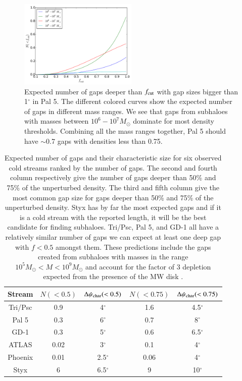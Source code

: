 \documentclass[useAMS,usenatbib]{mn2e}
\begin{document}
\begin{figure}
\centering
\includegraphics[width=0.5\textwidth]{observable_number_vs_f_cut_pal_5_array.pdf}
\caption{Expected number of gaps deeper than $f_{\rm cut}$ with gap sizes bigger than 1$^\circ$ in Pal 5. The different colored curves show the expected number of gaps in different mass ranges. We see that gaps from subhaloes with masses between $10^6-10^7 M_\odot$ dominate for most density thresholds. Combining all the mass ranges together, Pal 5 should have $\sim$0.7 gaps with densities less than 0.75.  } 
\label{fig:expected_gaps_Pal5}
\end{figure}  

\begin{table}
\begin{center}
\caption{Expected number of gaps and their characteristic size for six observed cold streams ranked by the number of gaps. The second and fourth column respectively give the number of gaps deeper than 50\% and 75\% of the unperturbed density. The third and fifth column give the most common gap size for gaps deeper than 50\% and 75\% of the unperturbed density. Styx has by far the most expected gaps and if it is a cold stream with the reported length, it will be the best candidate for finding subhaloes. Tri/Psc, Pal 5, and GD-1 all have a relatively similar number of gaps we can expect at least one deep gap with $f<0.5$ amongst them. These predictions include the gaps created from subhaloes with masses in the range $10^5 M_\odot < M < 10^9 M_\odot$ and account for the factor of 3 depletion expected from the presence of the MW disk \protect\citep{donghia_et_al_2010}. }
\begin{tabular}{|c|c|c|c|c|}
\hline
Stream & $N(<0.5)$ & $\Delta \psi_{\rm char}(<0.5)$ & $N(<0.75)$& $\Delta \psi_{\rm char}(<0.75)$  \\ \hline
Tri/Psc & 0.9 & 4$^\circ$ & 1.6 & 4.5$^\circ$\\
Pal 5 & 0.3 & 6$^\circ$ & 0.7 & 8$^\circ$\\ 
GD-1 & 0.3 & 5$^\circ$ & 0.6 & 6.5$^\circ$\\
ATLAS & 0.02 & 3$^\circ$ & 0.1 & 4$^\circ$\\
Phoenix & 0.01 & 2.5$^\circ$ & 0.06 & 4$^\circ$\\
Styx & 6 & 6.5$^\circ$ & 9 & 10$^\circ$\\
\hline
\end{tabular}
\label{tab:num_gaps}
\end{center}
\end{table}
\end{document}
